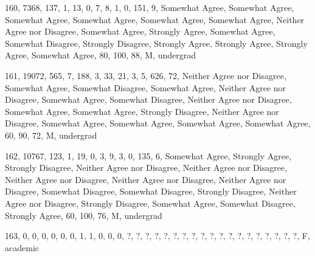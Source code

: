 \documentclass[12pt,twoside]{article}
\begin{document}
160, 7368, 137, 1, 13, 0, 7, 8, 1, 0, 151, 9, Somewhat Agree, Somewhat
Agree, Somewhat Agree, Somewhat Agree, Somewhat Agree, Somewhat Agree,
Neither Agree nor Disagree, Somewhat Agree, Strongly Agree, Somewhat
Agree, Somewhat Disagree, Strongly Disagree, Strongly Agree, Strongly
Agree, Strongly Agree, Somewhat Agree, 80, 100, 88, M, undergrad

161, 19072, 565, 7, 188, 3, 33, 21, 3, 5, 626, 72, Neither Agree nor
Disagree, Somewhat Agree, Somewhat Disagree, Somewhat Agree, Neither
Agree nor Disagree, Somewhat Agree, Somewhat Disagree, Neither Agree
nor Disagree, Somewhat Agree, Somewhat Agree, Strongly Disagree,
Neither Agree nor Disagree, Somewhat Agree, Somewhat Agree, Somewhat
Agree, Somewhat Agree, 60, 90, 72, M, undergrad

162, 10767, 123, 1, 19, 0, 3, 9, 3, 0, 135, 6, Somewhat Agree, Strongly
Agree, Strongly Disagree, Neither Agree nor Disagree, Neither Agree nor
Disagree, Neither Agree nor Disagree, Neither Agree nor Disagree,
Neither Agree nor Disagree, Somewhat Disagree, Somewhat Disagree,
Strongly Disagree, Neither Agree nor Disagree, Strongly Disagree,
Somewhat Agree, Somewhat Disagree, Strongly Agree, 60, 100, 76, M,
undergrad

163, 0, 0, 0, 0, 0, 0, 1, 1, 0, 0, 0, ?, ?, ?, ?, ?, ?, ?, ?, ?, ?, ?,
?, ?, ?, ?, ?, ?, ?, ?, F, academic


\bigskip


\bigskip
\end{document}
